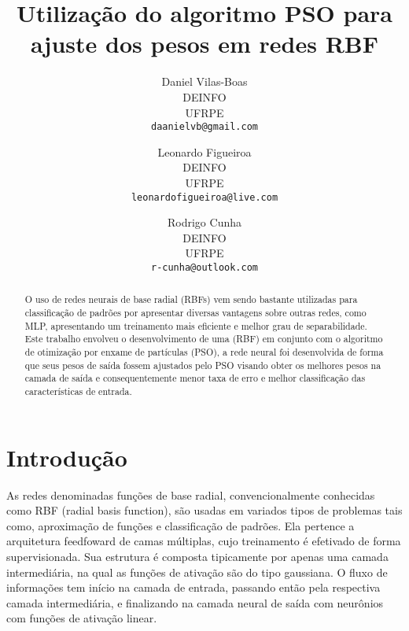 \documentclass[10pt,twocolumn,letterpaper]{article}
\begin{document}
\title{Utilização do algoritmo PSO para ajuste dos pesos em redes RBF}

\author{Daniel Vilas-Boas\\
DEINFO\\
UFRPE\\
{\tt\small daanielvb@gmail.com}
\and
Leonardo Figueiroa\\
DEINFO\\
UFRPE\\
{\tt\small leonardofigueiroa@live.com}
\and
Rodrigo Cunha\\
DEINFO\\
UFRPE\\
{\tt\small r-cunha@outlook.com}
}

\maketitle

\begin{abstract}
O uso de redes neurais de base radial (RBFs) vem sendo bastante utilizadas para classificação de padrões por apresentar diversas vantagens sobre outras redes, como MLP, apresentando um treinamento mais eficiente e melhor grau de separabilidade. Este trabalho envolveu o desenvolvimento de uma (RBF) em conjunto com o algoritmo de otimização por enxame de partículas (PSO), a rede neural foi desenvolvida de forma que seus pesos de saída fossem ajustados pelo PSO visando obter os melhores pesos na camada de saída e consequentemente menor taxa de erro e melhor classificação das características de entrada.
\end{abstract}

\section{Introdução}
As redes denominadas funções de base radial, convencionalmente conhecidas como RBF (radial basis function), são usadas em variados tipos de problemas tais como, aproximação de funções e classificação de padrões. Ela pertence a arquitetura feedfoward de camas múltiplas, cujo treinamento é efetivado de forma supervisionada. Sua estrutura é composta tipicamente por apenas uma camada intermediária, na qual as funções de ativação são do tipo gaussiana. O fluxo de informações tem início na camada de entrada, passando então pela respectiva camada intermediária, e finalizando na camada neural de saída com neurônios com funções de ativação linear. \\
\end{document}
